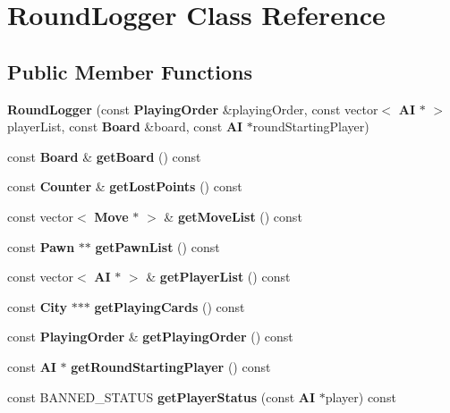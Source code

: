 \section{Round\-Logger Class Reference}
\label{class_round_logger}
\subsection*{Public Member Functions}
\begin{DoxyCompactItemize}
\item 
{\bfseries Round\-Logger} (const {\bf Playing\-Order} \&playing\-Order, const vector$<$ {\bf A\-I} $\ast$ $>$ player\-List, const {\bf Board} \&board, const {\bf A\-I} $\ast$round\-Starting\-Player)\label{class_round_logger_a52c7dc98a3b5ae1f2cc8aae99345b8d0}

\item 
const {\bf Board} \& {\bfseries get\-Board} () const \label{class_round_logger_a08f46631894e71a41826816ef0b0cde0}

\item 
const {\bf Counter} \& {\bfseries get\-Lost\-Points} () const \label{class_round_logger_aaa8b49bb49b3ffa35df429e1b9f6cfa3}

\item 
const vector$<$ {\bf Move} $\ast$ $>$ \& {\bfseries get\-Move\-List} () const \label{class_round_logger_a9abd61dd5ecf5f267ec97305dc313b40}

\item 
const {\bf Pawn} $\ast$$\ast$ {\bfseries get\-Pawn\-List} () const \label{class_round_logger_a2d0b4176229e86c7f7208df3e4e8e0fd}

\item 
const vector$<$ {\bf A\-I} $\ast$ $>$ \& {\bfseries get\-Player\-List} () const \label{class_round_logger_ae772e7fb8c0170c81e3fa6b5b7f28202}

\item 
const {\bf City} $\ast$$\ast$$\ast$ {\bfseries get\-Playing\-Cards} () const \label{class_round_logger_a517bee0efad4e4c75590669bb2857046}

\item 
const {\bf Playing\-Order} \& {\bfseries get\-Playing\-Order} () const \label{class_round_logger_a730043ba9a6d5fb559f4237a77c34ec3}

\item 
const {\bf A\-I} $\ast$ {\bfseries get\-Round\-Starting\-Player} () const \label{class_round_logger_aa8cdd6d2cdd56c9d5ba3281d3f33f5b9}

\item 
const B\-A\-N\-N\-E\-D\-\_\-\-S\-T\-A\-T\-U\-S {\bfseries get\-Player\-Status} (const {\bf A\-I} $\ast$player) const \label{class_round_logger_a7d71d945bf05d8b02b2cd1d4d903b52e}

\end{DoxyCompactItemize}
